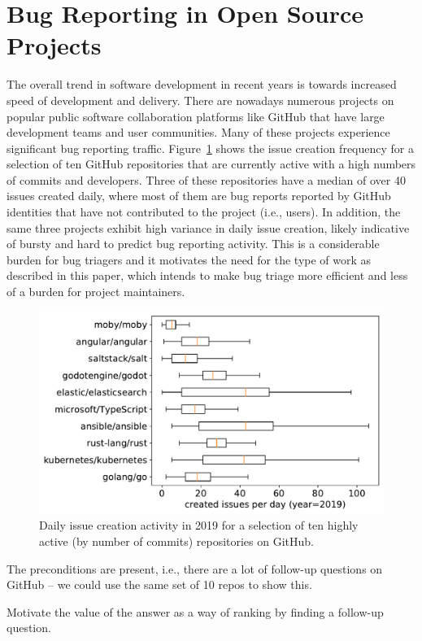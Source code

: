\section{Bug Reporting in Open Source Projects}


The overall trend in software development in recent years is towards increased
speed of development and delivery. There are nowadays numerous projects on popular
public software collaboration platforms like GitHub that have large development
teams and user communities. Many of these projects experience significant
bug reporting traffic. Figure~\ref{fig:repo_activity} shows the issue creation
frequency for a selection of ten GitHub repositories that are currently active
with a high numbers of commits and developers. Three of these repositories have
a median of over 40 issues created daily, where most of them are bug reports reported by
GitHub identities that have not contributed to the project (i.e., users). In addition,
the same three projects exhibit high variance in daily issue creation, likely indicative
of bursty and hard to predict bug reporting activity. This is a
considerable burden for bug triagers and it motivates the need for the type of work
as described in this paper, which intends to make bug triage more efficient and less of
a burden for project maintainers.

\begin{figure}[t]
\centering
\includegraphics[width=0.99\linewidth]{figures/popular_repos.pdf}
\caption{Daily issue creation activity in 2019 for a selection of ten highly active
(by number of commits) repositories on GitHub.}
\label{fig:repo_activity}
\end{figure}



The preconditions are present, i.e., there are a lot of follow-up questions on GitHub -- we could
use the same set of 10 repos to show this.




Motivate the value of the answer as a way of ranking by finding a follow-up question.
